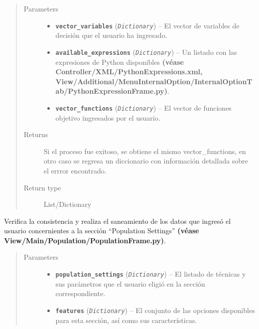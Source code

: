 \documentclass[class=report, crop=false]{standalone}
\begin{document}
\begin{fulllineitems}
\begin{fulllineitems}
\begin{quote}\begin{description}
\item[{Parameters}] \leavevmode\begin{itemize}
\item \textbf{\texttt{vector\_variables}} (\emph{\texttt{Dictionary}}) -- El vector de variables de decisión que el usuario ha ingresado.
\item \textbf{\texttt{available\_expressions}} (\emph{\texttt{Dictionary}}) -- Un listado con las expresiones de Python disponibles \textbf{(véase Controller/XML/PythonExpressions.xml,
View/Additional/MenuInternalOption/}\break\textbf{InternalOptionTab/PythonExpressionFrame.py)}.
\item \textbf{\texttt{vector\_functions}} (\emph{\texttt{Dictionary}}) -- El vector de funciones objetivo ingresados por el usuario.
\end{itemize}

\item[{Returns}] \leavevmode
Si el proceso fue exitoso, se obtiene el mismo vector\_functions,
en otro caso se regresa un diccionario con información detallada
sobre el errror encontrado.
\item[{Return type}] \leavevmode
List/Dictionary
\end{description}\end{quote}

\end{fulllineitems}

\begin{fulllineitems}

Verifica la consistencia y realiza el saneamiento de los datos
que ingresó el usuario concernientes a la sección ``Population Settings''
\textbf{(véase View/Main/}\break\textbf{Population/PopulationFrame.py)}.
\begin{quote}\begin{description}
\item[{Parameters}] \leavevmode\begin{itemize}
\item \textbf{\texttt{population\_settings}} (\emph{\texttt{Dictionary}}) -- El listado de técnicas y sus parámetros que el usuario eligió en la sección correspondiente.
\item \textbf{\texttt{features}} (\emph{\texttt{Dictionary}}) -- El conjunto de las opciones disponibles para esta sección, así como sus características.
\end{itemize}


\end{description}
\end{quote}
\end{fulllineitems}
\end{fulllineitems}
\end{document}
